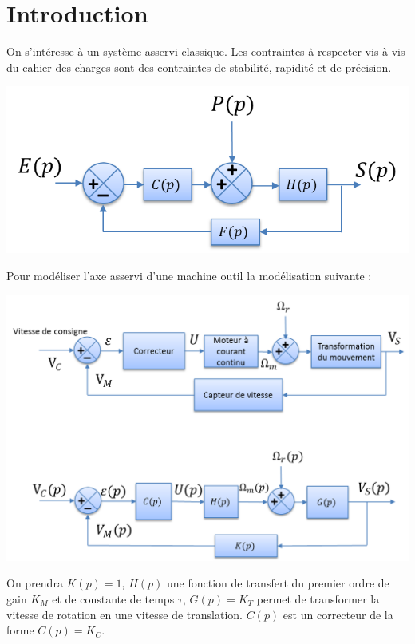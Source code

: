 \documentclass[10pt,fleqn]{article} %
\begin{document}








\section{Introduction}

On s'intéresse à un système asservi classique. Les contraintes à respecter vis-à vis du cahier des charges sont des contraintes de stabilité, rapidité et de précision.

\begin{center}
\includegraphics[width=.55\textwidth]{images/bloc1}
\end{center}

\begin{exemple}
Pour modéliser l'axe asservi d'une machine outil la modélisation suivante :
\begin{center}
\includegraphics[width=.6\textwidth]{images/bloc2}
\end{center}
On prendra $K(p)=1$, $H(p)$ une fonction de transfert du premier ordre de gain $K_M$ et de constante de temps $\tau$, $G(p)=K_T$ permet de transformer la vitesse de rotation en une vitesse de translation. $C(p)$ est un correcteur de la forme $C(p)=K_C$.
\end{exemple}
\end{document}
